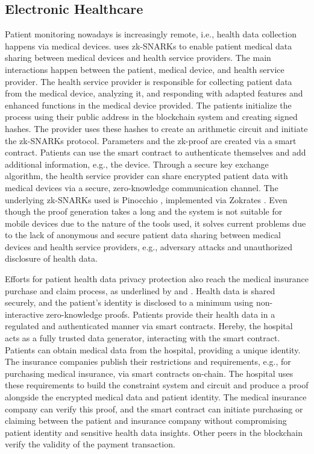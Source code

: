 \subsection{Electronic Healthcare}
Patient monitoring nowadays is increasingly remote, i.e., health data collection happens via medical devices. \citet{LuongPark} uses zk-SNARKs to enable patient medical data sharing between medical devices and health service providers. The main interactions happen between the patient, medical device, and health service provider. The health service provider is responsible for collecting patient data from the medical device, analyzing it, and responding with adapted features and enhanced functions in the medical device provided. The patients initialize the process using their public address in the blockchain system and creating signed hashes. The provider uses these hashes to create an arithmetic circuit and initiate the zk-SNARKs protocol. Parameters and the zk-proof are created via a smart contract. Patients can use the smart contract to authenticate themselves and add additional information, e.g., the device. Through a secure key exchange algorithm, the health service provider can share encrypted patient data with medical devices via a secure, zero-knowledge communication channel. The underlying zk-SNARKs used is Pinocchio \citep{Pinocchio}, implemented via Zokrates \citep{ZoKrates}. Even though the proof generation takes a long and the system is not suitable for mobile devices due to the nature of the tools used, it solves current problems due to the lack of anonymous and secure patient data sharing between medical devices and health service providers, e.g., adversary attacks and unauthorized disclosure of health data.

Efforts for patient health data privacy protection also reach the medical insurance purchase and claim process, as underlined by \citet{ZHENG} and \citet{WangEtAl}. Health data is shared securely, and the patient's identity is disclosed to a minimum using non-interactive zero-knowledge proofs. Patients provide their health data in a regulated and authenticated manner via smart contracts. Hereby, the hospital acts as a fully trusted data generator, interacting with the smart contract. Patients can obtain medical data from the hospital, providing a unique identity. The insurance companies publish their restrictions and requirements, e.g., for purchasing medical insurance, via smart contracts on-chain. The hospital uses these requirements to build the constraint system and circuit and produce a proof alongside the encrypted medical data and patient identity. The medical insurance company can verify this proof, and the smart contract can initiate purchasing or claiming between the patient and insurance company without compromising patient identity and sensitive health data insights. Other peers in the blockchain verify the validity of the payment transaction.

